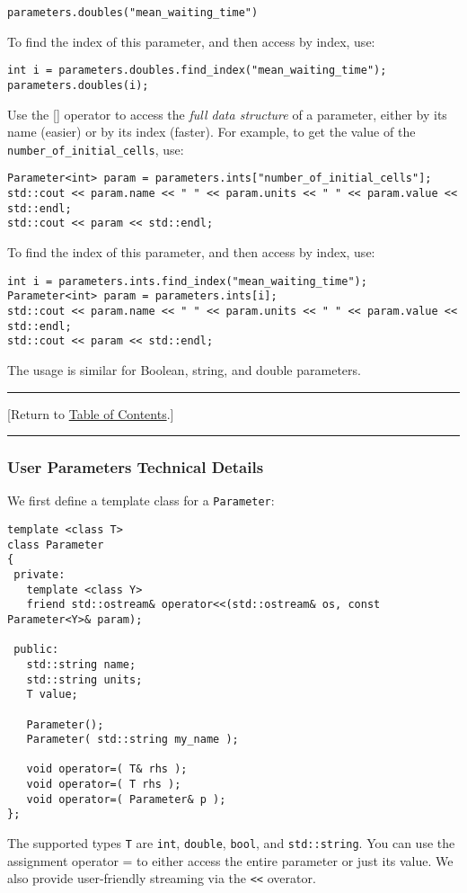\documentclass[12pt]{article}
\renewcommand{\v}{\verb}
\newcommand{\TOClink}{\begin{center}\hrule\vskip-10pt\phantom{.}\hfill[Return to \hyperlink{TOC}{Table of Contents}.]\hfill\phantom{.}\vskip3pt\hrule\end{center}}
\begin{document}
\begin{verbatim}
parameters.doubles("mean_waiting_time")
\end{verbatim}

To find the index of this parameter, and then access by index, use: 

\begin{verbatim}
int i = parameters.doubles.find_index("mean_waiting_time");
parameters.doubles(i); 
\end{verbatim}

Use the [] operator to access the \emph{full data structure} of a parameter, either 
by its name (easier) or by its index (faster). For example, to get 
the value of the \v|number_of_initial_cells|, use: 

\begin{verbatim}
Parameter<int> param = parameters.ints["number_of_initial_cells"];
std::cout << param.name << " " << param.units << " " << param.value << std::endl; 
std::cout << param << std::endl; 
\end{verbatim}

To find the index of this parameter, and then access by index, use: 

\begin{verbatim}
int i = parameters.ints.find_index("mean_waiting_time");
Parameter<int> param = parameters.ints[i]; 
std::cout << param.name << " " << param.units << " " << param.value << std::endl; 
std::cout << param << std::endl; 
\end{verbatim}

The usage is similar for Boolean, string, and double parameters. 

\TOClink


\subsubsection{User Parameters Technical Details}
\label{sec:XML_user_parameters_data_types}
We first define a template class for a \v|Parameter|: 
\begin{verbatim}
template <class T> 
class Parameter
{
 private:
   template <class Y>
   friend std::ostream& operator<<(std::ostream& os, const Parameter<Y>& param); 

 public: 
   std::string name; 
   std::string units; 
   T value; 
   
   Parameter();
   Parameter( std::string my_name ); 
   
   void operator=( T& rhs ); 
   void operator=( T rhs ); 
   void operator=( Parameter& p ); 
};
\end{verbatim} 
The supported types \v|T| are \v|int|, \v|double|, \v|bool|, and \v|std::string|. You can use 
the assignment operator = to either access the entire parameter or just its value. 
We also provide user-friendly streaming via the \v|<<| overator. 
\end{document}
